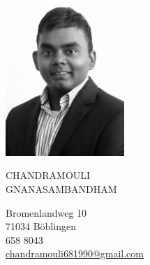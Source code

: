 \documentclass{mycv}
\begin{document}
\sloppy %
\color{templateColor1}
\AddToShipoutPicture{\BackgroundPic}

\normalfont
\begin{minipage}[c]{0.3\textwidth}
	\centering
	\includegraphics[width=4.5cm,height=6cm]{../img/CV_Photo.jpg}
\end{minipage}
\begin{minipage}[]{0.7\textwidth}

  \vspace{5mm}
	{\Huge CHANDRAMOULI}\\

	{\Huge GNANASAMBANDHAM}
	\vspace{2mm}

	\vspace{2mm}

  Bromenlandweg 10\\
	71034 B{\"o}blingen\\

	 658 8043\\
	\mailIcon \href{mailto:chandramouli681990@gmail.com}{chandramouli681990@gmail.com}
  
  \vspace{13mm}
\end{minipage}
\end{document}
